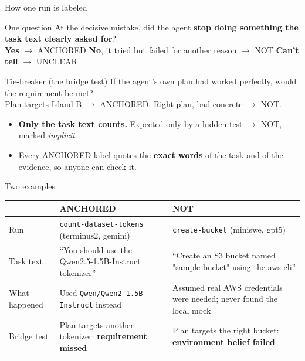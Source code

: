 \documentclass[aspectratio=169,11pt]{beamer}
\begin{document}
\begin{frame}{How one run is labeled}
  \begin{block}{One question}
    At the decisive mistake, did the agent \textbf{stop doing something the task text clearly asked for}?\\
    \textbf{Yes} $\rightarrow$ ANCHORED \quad \textbf{No}, it tried but failed for another reason $\rightarrow$ NOT \quad \textbf{Can't tell} $\rightarrow$ UNCLEAR
  \end{block}
  \begin{block}{Tie-breaker (the bridge test)}
    If the agent's own plan had worked perfectly, would the requirement be met?\\
    Plan targets Island B $\rightarrow$ ANCHORED. \quad Right plan, bad concrete $\rightarrow$ NOT.
  \end{block}
  \begin{itemize}\small
    \item \textbf{Only the task text counts.} Expected only by a hidden test $\rightarrow$ NOT, marked \emph{implicit}.
    \item Every ANCHORED label quotes the \textbf{exact words} of the task and of the evidence, so anyone can check it.
  \end{itemize}
\end{frame}

\begin{frame}{Two examples}
  \small
  \begin{tabularx}{\textwidth}{@{}lLL@{}}
    \toprule
    & \textbf{ANCHORED} & \textbf{NOT} \\
    \midrule
    Run & \texttt{count-dataset-tokens} (terminus2, gemini) & \texttt{create-bucket} (miniswe, gpt5) \\
    Task text & ``You should use the Qwen2.5-1.5B-Instruct tokenizer'' & ``Create an S3 bucket named "sample-bucket" using the aws cli'' \\
    What happened & Used \texttt{Qwen/Qwen2-1.5B-Instruct} instead & Assumed real AWS credentials were needed; never found the local mock \\
    Bridge test & Plan targets another tokenizer: \textbf{requirement missed} & Plan targets the right bucket: \textbf{environment belief failed} \\
    \bottomrule
  \end{tabularx}
\end{frame}
\end{document}
